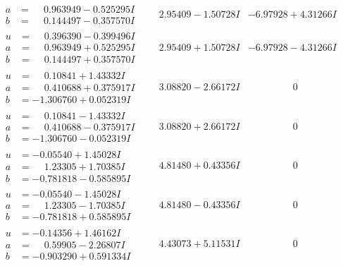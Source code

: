\documentclass[1p]{elsarticle_modified}
\theoremstyle{definition}
\begin{document}
$$\begin{array}{c|c|c}
\begin{aligned}
a &= \phantom{-}0.963949 - 0.525295 I \\
b &= \phantom{-}0.144497 - 0.357570 I\end{aligned}
 & \phantom{-}2.95409 - 1.50728 I & -6.97928 + 4.31266 I \\ \hline\begin{aligned}
u &= \phantom{-}0.396390 - 0.399496 I \\
a &= \phantom{-}0.963949 + 0.525295 I \\
b &= \phantom{-}0.144497 + 0.357570 I\end{aligned}
 & \phantom{-}2.95409 + 1.50728 I & -6.97928 - 4.31266 I \\ \hline\begin{aligned}
u &= \phantom{-}0.10841 + 1.43332 I \\
a &= \phantom{-}0.410688 + 0.375917 I \\
b &= -1.306760 + 0.052319 I\end{aligned}
 & \phantom{-}3.08820 - 2.66172 I & \phantom{-0.000000 } 0 \\ \hline\begin{aligned}
u &= \phantom{-}0.10841 - 1.43332 I \\
a &= \phantom{-}0.410688 - 0.375917 I \\
b &= -1.306760 - 0.052319 I\end{aligned}
 & \phantom{-}3.08820 + 2.66172 I & \phantom{-0.000000 } 0 \\ \hline\begin{aligned}
u &= -0.05540 + 1.45028 I \\
a &= \phantom{-}1.23305 + 1.70385 I \\
b &= -0.781818 - 0.585895 I\end{aligned}
 & \phantom{-}4.81480 + 0.43356 I & \phantom{-0.000000 } 0 \\ \hline\begin{aligned}
u &= -0.05540 - 1.45028 I \\
a &= \phantom{-}1.23305 - 1.70385 I \\
b &= -0.781818 + 0.585895 I\end{aligned}
 & \phantom{-}4.81480 - 0.43356 I & \phantom{-0.000000 } 0 \\ \hline\begin{aligned}
u &= -0.14356 + 1.46162 I \\
a &= \phantom{-}0.59905 - 2.26807 I \\
b &= -0.903290 + 0.591334 I\end{aligned}
 & \phantom{-}4.43073 + 5.11531 I & \phantom{-0.000000 } 0 \\ \hline\begin{aligned}

\end{aligned}
\end{array}$$
\end{document}
